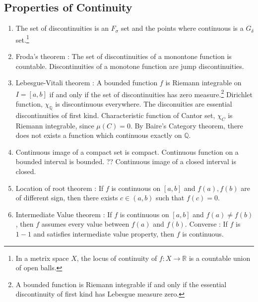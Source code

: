 \subsection{Properties of Continuity}
\begin{enumerate}
	\item The set of discontinuities is an $F_\sigma$ set and the points where continuous is a $G_\delta$ set.\footnote{In a metrix space $X$, the locus of continuity of $f : X \to \mathbb{R}$ is a countable union of open balls.}
	\item Froda's theorem : The set of discontinuities of a monontone function is countable.
	\subitem Discontinuities of a monotone function are jump discontinuities.
	\item Lebesgue-Vitali theorem : A bounded function $f$ is Riemann integrable on $I=[a,b]$ if and only if the set of discontinuities has zero measure.\footnote{A bounded function is Riemann integrable if and only if the essential discontinuity of first kind has Lebesgue measure zero.}
	\subitem Dirichlet function, $\chi_\mathbb{Q}$ is discontinuous everywhere. The disconuities are essential discontinuities of first kind.
	\subitem Characteristic function of Cantor set, $\chi_C$ is Riemann integrable, since $\mu(C)=0$.
	\subitem By Baire's Category theorem, there does not exists a function which continuous exactly on $\mathbb{Q}$.
	\item Continuous image of a compact set is compact.
	\subitem Continuous function on a bounded interval is bounded. ??
	\subitem Continuous image of a closed interval is closed.
	\item Location of root theorem : If $f$ is continuous on $[a,b]$ and $f(a),f(b)$ are of different sign, then there exists $c \in (a,b)$ such that $f(c) = 0$.
	\item Intermediate Value theorem : If $f$ is continuous on $[a,b]$ and $f(a) \ne f(b)$, then $f$ assumes every value between $f(a)$ and $f(b)$.
	\subitem Converse : If $f$ is $1-1$ and satisfies intermediate value property, then $f$ is continuous.
\end{enumerate}

